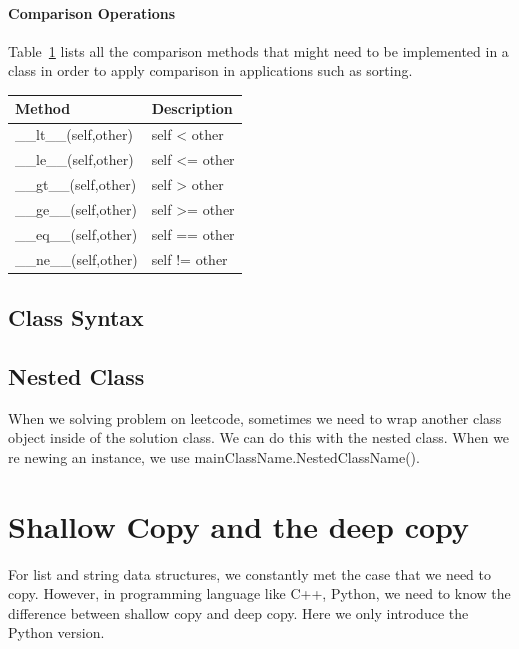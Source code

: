 \documentclass[../main.tex]{subfiles}
\begin{document}
\paragraph{Comparison Operations} Table~\ref{tab:special_methods_for_comparison_operations} lists all the comparison methods that might need to be implemented in a class in order to apply comparison in applications such as sorting. 

\begin{table}[h]
\begin{small}
\centering
\noindent{}
 \noindent \begin{tabular}{|p{}|p{}|}
  \hline
Method& Description \\ \hline
\_\_lt\_\_(self,other) & self < other \\ \hline
\_\_le\_\_(self,other) & self <= other \\ \hline
\_\_gt\_\_(self,other) & self > other  \\ \hline
\_\_ge\_\_(self,other) & self >= other  \\ \hline
\_\_eq\_\_(self,other) & self == other  \\ \hline
\_\_ne\_\_(self,other) & self != other  \\ \hline
\end{tabular}
  \label{tab:special_methods_for_comparison_operations}
  \end{small}
\end{table} 


\subsection{Class Syntax}
\subsection{Nested Class}
When we solving problem on leetcode, sometimes we need to wrap another class object inside of the solution class. We can do this with the nested class. When we re newing an instance, we use mainClassName.NestedClassName().

\section{Shallow Copy and the deep copy}
\label{shallow_deep_copy}
For list and string data structures, we constantly met the case that we need to copy. However, in programming language like C++, Python, we need to know the difference between shallow copy and deep copy. Here we only introduce the Python version. 
\end{document}
